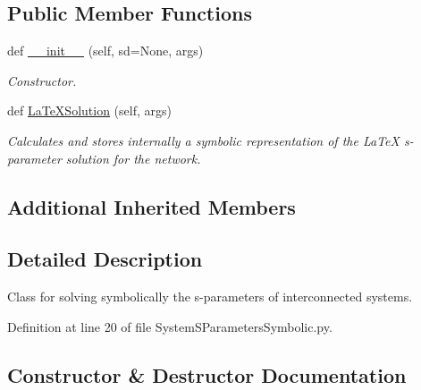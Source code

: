 \subsection*{Public Member Functions}
\begin{DoxyCompactItemize}
\item 
def \hyperlink{classSignalIntegrity_1_1SystemDescriptions_1_1SystemSParametersSymbolic_1_1SystemSParametersSymbolic_a72fa31992e716f60779f561f6cdbb4ce}{\+\_\+\+\_\+init\+\_\+\+\_\+} (self, sd=None, args)
\begin{DoxyCompactList}\small\item\em Constructor. \end{DoxyCompactList}\item 
def \hyperlink{classSignalIntegrity_1_1SystemDescriptions_1_1SystemSParametersSymbolic_1_1SystemSParametersSymbolic_af98307fa6ec51f1bd11fe6abebbb9595}{La\+Te\+X\+Solution} (self, args)
\begin{DoxyCompactList}\small\item\em Calculates and stores internally a symbolic representation of the La\+TeX s-\/parameter solution for the network. \end{DoxyCompactList}\end{DoxyCompactItemize}
\subsection*{Additional Inherited Members}


\subsection{Detailed Description}
Class for solving symbolically the s-\/parameters of interconnected systems. 



Definition at line 20 of file System\+S\+Parameters\+Symbolic.\+py.



\subsection{Constructor \& Destructor Documentation}
\mbox{\label{classSignalIntegrity_1_1SystemDescriptions_1_1SystemSParametersSymbolic_1_1SystemSParametersSymbolic_a72fa31992e716f60779f561f6cdbb4ce}} 
